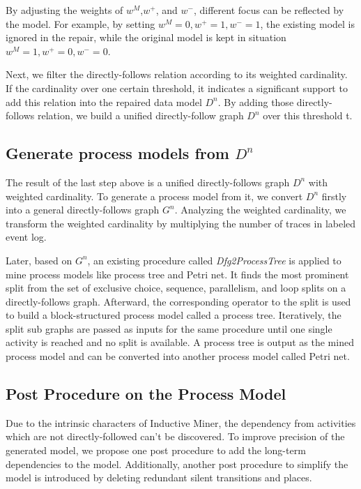 By adjusting the weights of $w^{M}$,$w^{+}$, and $w^{-}$, different focus can be reflected by the model. For example, by setting $w^{M}=0, w^{+}=1,w^{-}=1$, the existing model is ignored in the repair, while  the original model is kept in situation $w^{M}=1, w^{+}=0,w^{-}=0$.

Next, we filter the directly-follows relation according to its weighted cardinality. If the cardinality over one certain threshold, it indicates a significant support to add this relation into the repaired data model $D^n$. By adding those directly-follows relation, we build a unified directly-follow graph $D^n$ over this threshold t. 
\subsection{Generate process models from $D^n$}
The result of the last step above is a unified directly-follows graph $D^n$ with weighted cardinality. To generate a process model from it, we convert $D^n$ firstly into a general directly-follows graph $G^n$. Analyzing the weighted cardinality, we transform the weighted cardinality by multiplying the number of traces in labeled event log.


Later, based on $G^n$, an existing procedure called \emph{Dfg2ProcessTree} is applied to mine process models like process tree and Petri net\cite{leemans2013discovering}. It finds the most prominent split from the set of exclusive choice, sequence, parallelism, and loop splits on  a directly-follows graph.  Afterward, the corresponding operator to the split is used to build a block-structured process model called a process tree. Iteratively, the split sub graphs are passed as inputs for the same procedure until one single activity is reached and no split is available. A process tree is output as the mined process model and can be converted into another process model called Petri net.
\subsection{Post Procedure on the Process Model}
Due to the intrinsic characters of Inductive Miner, the dependency from activities which are not directly-followed can't be discovered. To improve precision of the generated model, we propose one post procedure to add the long-term dependencies to the model. Additionally, another post procedure to simplify the model is introduced by deleting redundant silent transitions and places.
